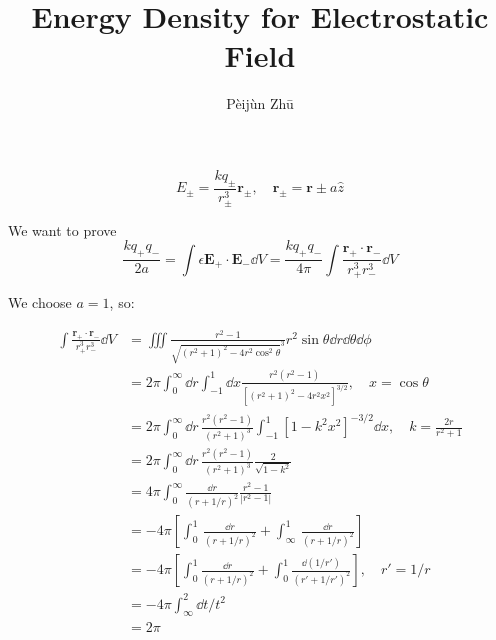 \documentclass{article}
\title{Energy Density for Electrostatic Field}
\author{P\`eij\`un Zh\=u}
\begin{document}
\maketitle
\[E_\pm=\frac{kq_\pm}{r_\pm^3}\bm r_\pm,\quad \bm r_\pm=\bm r\pm a\hat z\]

We want to prove
\[\frac{kq_+q_-}{2a}=\int\epsilon \bm E_+\cdot \bm E_-\dd V=\frac{kq_+q_-}{4\pi}\int  \frac{\bm r_+\cdot \bm r_-}{r_+^3r_-^3} \dd V\]

We choose $a=1$, so:

\begin{align}
\int\frac{\bm r_+\cdot \bm r_-}{r_+^3r_-^3}\dd V&=\iiint\frac{r^2-1}{\sqrt{(r^2+1)^2-4r^2\cos^2\theta}^3}r^2\sin\theta \dd r\dd\theta \dd\phi\\
&=2\pi\int_0^\infty\dd r\int_{-1}^{1}\dd x \frac{r^2(r^2-1)}{[(r^2+1)^2-4r^2x^2]^{3/2}}, \quad x=\cos\theta\\
&=2\pi\int_0^\infty\dd r\,\frac{r^2(r^2-1)}{(r^2+1)^3} \int_{-1}^1[1-k^2x^2]^{-3/2}\dd x, \quad k=\frac{2r}{r^2+1}\\
&=2\pi\int_0^\infty\dd r\,\frac{r^2(r^2-1)}{(r^2+1)^3} \frac{2}{\sqrt{1-k^2}}\\
&=4\pi\int_0^\infty\frac{\dd r}{(r+1/r)^2} \frac{r^2-1}{|r^2-1|}\\
&=-4\pi\left[\int_0^1\,\frac{\dd r}{(r+1/r)^2}+\int_{\infty}^1\,\frac{\dd r}{(r+1/r)^2}\right]\\
&=-4\pi\left[\int_0^1\frac{\dd r}{(r+1/r)^2}+\int_0^1\frac{\dd(1/r')}{(r'+1/r')^2}\right],\quad r'=1/r\\
&=-4\pi \int_\infty^2 \dd t/t^2\\
&=2\pi
\end{align}
\end{document}

